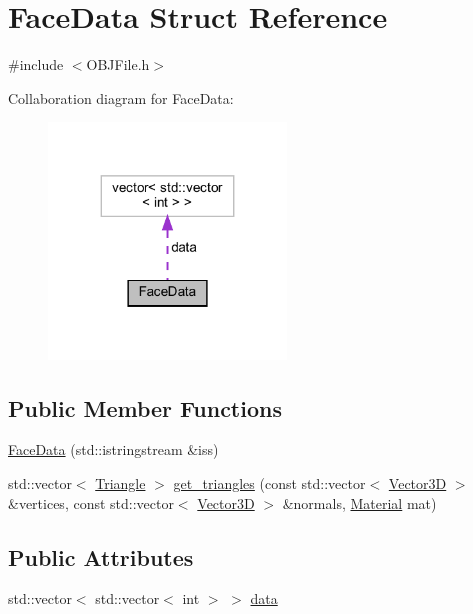 \hypertarget{structFaceData}{}\section{Face\+Data Struct Reference}
\label{structFaceData}


{\ttfamily \#include $<$O\+B\+J\+File.\+h$>$}



Collaboration diagram for Face\+Data\+:
\nopagebreak
\begin{figure}[H]
\begin{center}
\leavevmode
\includegraphics[width=179pt]{structFaceData__coll__graph}
\end{center}
\end{figure}
\subsection*{Public Member Functions}
\begin{DoxyCompactItemize}
\item 
\mbox{\hyperlink{structFaceData_a551092a23b9870e60bb840e6079f786d}{Face\+Data}} (std\+::istringstream \&iss)
\item 
std\+::vector$<$ \mbox{\hyperlink{classTriangle}{Triangle}} $>$ \mbox{\hyperlink{structFaceData_a641796d91855ab809b4b56e563b53be2}{get\+\_\+triangles}} (const std\+::vector$<$ \mbox{\hyperlink{classVector3D}{Vector3D}} $>$ \&vertices, const std\+::vector$<$ \mbox{\hyperlink{classVector3D}{Vector3D}} $>$ \&normals, \mbox{\hyperlink{classMaterial}{Material}} mat)
\end{DoxyCompactItemize}
\subsection*{Public Attributes}
\begin{DoxyCompactItemize}
\item 
std\+::vector$<$ std\+::vector$<$ int $>$ $>$ \mbox{\hyperlink{structFaceData_adb2e792d840b92f060ea4c615a91b0c3}{data}}
\end{DoxyCompactItemize}


